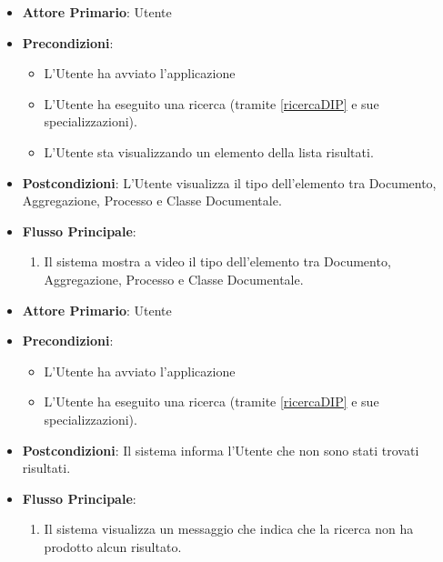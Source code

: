 \begin{itemize}
      \item \textbf{Attore Primario}: Utente
      \item \textbf{Precondizioni}: 
      \begin{itemize}
            \item L'Utente ha avviato l'applicazione
            \item L'Utente ha eseguito una ricerca (tramite \ref{ricercaDIP} e sue specializzazioni).
            \item L'Utente sta visualizzando un elemento della lista risultati.
      \end{itemize}
      \item \textbf{Postcondizioni}: L'Utente visualizza il tipo dell'elemento tra Documento, Aggregazione, Processo e Classe Documentale.
      \item \textbf{Flusso Principale}:
      \begin{enumerate}
            \item Il sistema mostra a video il tipo dell'elemento tra Documento, Aggregazione, Processo e Classe Documentale.
      \end{enumerate}
\end{itemize}

\begin{itemize}
      \item \textbf{Attore Primario}: Utente
      \item \textbf{Precondizioni}: \begin{itemize}
            \item L'Utente ha avviato l'applicazione
            \item L'Utente ha eseguito una ricerca (tramite \ref{ricercaDIP} e sue specializzazioni).
      \end{itemize}
      \item \textbf{Postcondizioni}: Il sistema informa l'Utente che non sono stati trovati risultati.
      \item \textbf{Flusso Principale}:
      \begin{enumerate}
            \item Il sistema visualizza un messaggio che indica che la ricerca non ha prodotto alcun risultato.
      \end{enumerate}
\end{itemize}

